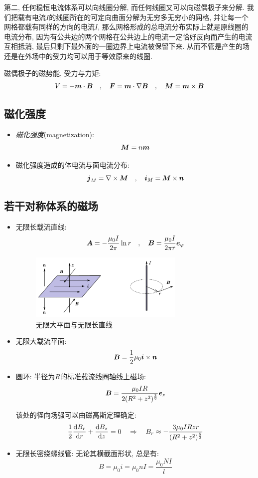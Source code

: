 第二, 任何稳恒电流体系可以向线圈分解, 而任何线圈又可以向磁偶极子来分解. 我们把载有电流$I$的线圈所在的可定向曲面分解为无穷多无穷小的网格, 并让每一个网格都载有同样的方向的电流$I$, 那么网格形成的总电流分布实际上就是原线圈的电流分布, 因为有公共边的两个网格在公共边上的电流一定恰好反向而产生的电流互相抵消, 最后只剩下最外面的一圈边界上电流被保留下来. 从而不管是产生的场还是在外场中的受力均可以用于等效原来的线圈.

磁偶极子的磁势能, 受力与力矩:
\[V=-\boldsymbol{m}\cdot \boldsymbol{B}\quad ,\quad \boldsymbol{F}=\boldsymbol{m}\cdot \nabla\boldsymbol{B}\quad ,\quad \boldsymbol{M}=\boldsymbol{m}\times \boldsymbol{B}\]



\subsection{磁化强度}

\begin{itemize}
\item \emph{磁化强度}(magnetization):
\[\boldsymbol{M}=n\boldsymbol{m}\]

\item 磁化强度造成的体电流与面电流分布:
\[\boldsymbol{j}_M=\nabla\times \boldsymbol{M}\quad ,\quad \boldsymbol{i}_M=\boldsymbol{M}\times \boldsymbol{n}\]


\end{itemize}

\subsection{若干对称体系的磁场}

\begin{itemize}
\item 无限长载流直线:
\[\boldsymbol{A}=-\frac{\mu_0 I}{2\pi}\ln r\quad ,\quad \boldsymbol{B}=\frac{\mu_0 I}{2\pi r}\boldsymbol{e}_\varphi\]

\begin{figure}[H]
\centering
\includegraphics[width=0.7\textwidth]{image/7-4-1.png}
\caption{无限大平面与无限长直线}\label{fig7-4-1}
\end{figure}

\item 无限大载流平面:
\[\boldsymbol{B}=\frac{1}{2}\mu_0\boldsymbol{i}\times \boldsymbol{n}\]

\item 圆环: 半径为$R$的标准载流线圈轴线上磁场:
\[\boldsymbol{B}=\frac{\mu_0IR}{2(R^2+z^2)^{\frac{3}{2}}}\boldsymbol{e}_z\]

该处的径向场强可以由磁高斯定理确定:
\[\frac{1}{2}\frac{\textrm{d} B_r}{\textrm{d} r}+\frac{\textrm{d} B_z}{\textrm{d} z}=0\quad \Rightarrow \quad B_r\approx -\frac{3\mu_0IRzr}{(R^2+z^2)^{\frac{5}{2}}}\]

\item 无限长密绕螺线管: 无论其横截面形状, 总是有:
\[B=\mu_0 i=\mu_0 nI=\frac{\mu_0 NI}{l}\]
\end{itemize}


